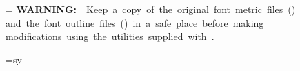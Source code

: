 \def\colornsection#1{\darkred\nsection{#1}\revert}
\def\colornsubsection#1{\peagreen\nsubsection{#1}\revert}
\def\colornsubsubsection#1{\nsubsubsection{#1}}




\newbox\boxa

\setbox\boxa=\vbox{
\hbox{{\bf \reverseon WARNING: \reverseoff} Keep a copy of the original font metric files ({\PFM})}
\hbox{and the font outline files ({\PFB}) in a safe place before making}
\hbox{modifications using the utilities supplied with {\DVIWindo}.}
}

\def\warning{\centerline{\rulered\brightred\boxit{\copy\boxa}\revert\rulerevert}}


\font\sy=sy

\def\registered{{\sy \char210}}

\def\TM{$^{\smlsize TM}$}

